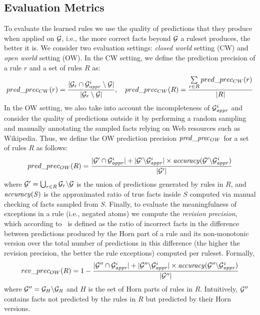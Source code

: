 \subsection{Evaluation Metrics} 
To evaluate the learned rules we use the quality of predictions that they produce %
when applied on $\mathcal{G}$, i.e., the more correct facts beyond $\mathcal{G}$ a ruleset produces, the better it is.  
We consider two evaluation settings: \emph{closed world} setting (CW) and \emph{open world} setting (OW). 
In the CW setting, we define the prediction precision of a rule $r$ and a set of rules $R$ as:
\begin{align*}
  pred\_prec_{CW}(r) = \frac{|\mathcal{G}_r \cap \mathcal{G}^i_{appr} \setminus \mathcal{G}|}{|\mathcal{G}_r \setminus \mathcal{G}|},
  \quad 
  pred\_prec_{CW}(R) = \frac{\sum\limits_{r\in R} pred\_prec_{CW}(r)}{|R|}
\end{align*}  
In the OW setting, we also take into account the incompleteness of $\mathcal{G}^i_{\mathit{appr}}$ and  
consider the quality of predictions outside it by performing a random sampling and manually annotating the sampled facts relying on Web resources such as Wikipedia. Thus, we define the OW prediction precision $\mathit{pred\_prec_{OW}}$ for a set of rules $R$ as follows:
\[
pred\_prec_{OW}(R) = \frac{|\mathcal{G}'\cap \mathcal{G}^i_{\mathit{appr}}|+|\mathcal{G}'\backslash \mathcal{G}^i_{\mathit{appr}}|\times \mathit{accuracy(\mathcal{G}'\backslash \mathcal{G}^i_{\mathit{appr}})}}{|\mathcal{G}'|}
\]
where $\mathcal{G}'=\bigcup_{r\in R}\mathcal{G}_r\backslash \mathcal{G}$ is the union of predictions generated by rules in $R$, and $\mathit{accuracy(S)}$ is the approximated ratio of true facts inside $S$ computed via manual checking of facts sampled from $S$. 
Finally, to evaluate the meaningfulness of exceptions in a rule (i.e., negated atoms) we compute the \textit{revision precision}, which according to~\cite{trantowards} is defined as the ratio of incorrect facts in the difference between predictions produced by the Horn part of a rule and its non-monotonic version over the total number of predictions in this difference (the higher the revision precision, the better the rule exceptions) computed per ruleset. Formally,
\begin{align*}
rev\_prec_{OW}(R) = 1-\frac{|\mathcal{G}'' \cap \mathcal{G}^i_{\mathit{appr}}|+|\mathcal{G}''\backslash \mathcal{G}^i_{\mathit{appr}}|\times \mathit{accuracy(\mathcal{G}''\backslash \mathcal{G}^i_{\mathit{appr}})}}{|\mathcal{G}''|}  
\end{align*}
where $\mathcal{G}''=\mathcal{G}_H\backslash \mathcal{G}_R$ and $H$ is the set of Horn parts of rules in $R$. 
Intuitively, $\mathcal{G}''$ contains facts not predicted by the rules in $R$ but predicted by their Horn versions. 
 
